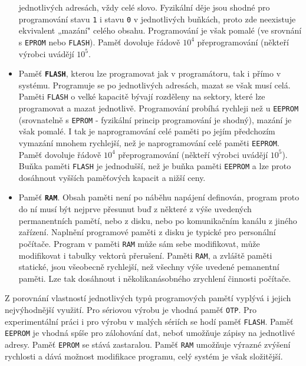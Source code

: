 \begin{itemize}
              jednotlivých adresách, vždy celé slovo. Fyzikální děje jsou shodné pro programování 
              stavu \texttt{1} i stavu \texttt{0} v jednotlivých buňkách, proto zde neexistuje 
              ekvivalent „mazání" celého obsahu. Programování je však pomalé (ve srovnání s 
              \texttt{EPROM} nebo \texttt{FLASH}). Paměť dovoluje řádově \(10^4\) přeprogramování 
              (někteří výrobci uvádějí \(10^5\).
        \item Paměť \textbf{\texttt{FLASH}}, kterou lze programovat jak v programátoru, tak i přímo
              v systému. Programuje se po jednotlivých adresách, mazat se však musí celá. Paměti 
              \texttt{FLASH} o velké kapacitě bývají rozděleny na sektory, které lze programovat a 
              mazat jednotlivě. Programování probíhá rychleji než u \texttt{EEPROM} (srovnatelně s 
              \texttt{EPROM} - fyzikální princip programování je shodný), mazání je však pomalé. I 
              tak je naprogramování celé paměti po jejím předchozím vymazání mnohem rychlejší, než 
              je naprogramování celé paměti \texttt{EEPROM}. Paměť dovoluje řádově \(10^4\) 
              přeprogramování (někteří výrobci uvádějí \(10^5\)). Buňka paměti \texttt{FLASH} je 
              jednodušší, než je buňka paměti \texttt{EEPROM} a lze proto dosáhnout vyšších 
              paměťových kapacit a nižší ceny.
        \item Paměť \textbf{\texttt{RAM}}. Obsah paměti není po náběhu napájení definován, program  
              proto do ní musí být nejprve přesunut buď z některé z výše uvedených permanentních 
              pamětí, nebo z disku, nebo po komunikačním kanálu z jiného zařízení. Naplnění 
              programové paměti z disku je typické pro personální počítače. Program v paměti 
              \texttt{RAM} může sám sebe modifikovat, může modifikovat i tabulky vektorů přerušení. 
              Paměti \texttt{RAM}, a zvláště paměti statické, jsou všeobecně rychlejší, než všechny 
              výše uvedené pemanentní paměti. Lze tak dosáhnout i několikanásobného zrychlení 
              činnosti počítače.        
      \end{itemize}
      
      Z porovnání vlastností jednotlivých typů programových pamětí vyplývá i jejich nejvýhodnější 
      využití. Pro sériovou výrobu je vhodná paměť \texttt{OTP}. Pro experimentální práci i pro 
      výrobu v malých sériích se hodí paměť \texttt{FLASH}. Paměť \texttt{EEPROM} je vhodná spíše 
      pro zálohování dat, neboť umožňuje zápisy na jednotlivé adresy. Paměť \texttt{EPROM} se stává 
      zastaralou. Paměť \texttt{RAM} umožňuje výrazné zvýšení rychlosti a dává možnost modifikace 
      programu, celý systém je však složitější.
      
